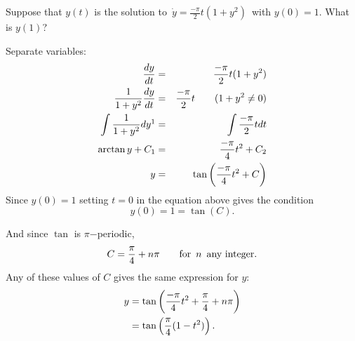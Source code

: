 \begin{homework}
  Suppose that $y(t)$ is the solution to $\, \displaystyle \dot y = \frac{-\pi }{2}t(1+y^2)\,$
  with $y(0) = 1$. What is $y(1)$?
\end{homework}
Separate variables:
\begin{eqnarray*}
  \displaystyle \frac{dy}{dt}
  \displaystyle &=& \displaystyle \frac{-\pi }{2}t(1+y^2) \\
  \displaystyle  \frac{1}{1+y^2} \frac{dy}{dt}
  \displaystyle &=& \frac{-\pi }{2}t \qquad (1+y^2\neq 0) \\
  \displaystyle  \int \frac{1}{1+y^2} dy \footnotemark
  \displaystyle &=& \int \frac{-\pi }{2}t dt  \\
  \displaystyle  \arctan y + C_1 
  \displaystyle &=& \frac{-\pi }{4}t^2 + C_2 \\
  \displaystyle  y 
  \displaystyle &=& \tan \left( \frac{-\pi }{4}t^2 + C \right)
\end{eqnarray*}
Since $y(0) = 1$ setting $t = 0$ in the equation above gives the condition
\begin{equation*}
  y(0) = 1 = \tan (C). 
\end{equation*}

And since $\tan$ is $\pi$−periodic,
\begin{equation*}
  \displaystyle
  \displaystyle C
  \displaystyle =\frac{\pi }{4} +n\pi \qquad \text {for }\, n\,
  \text { any integer}.
\end{equation*}
Any of these values of $C$ gives the same expression for $y$:
\begin{align*}
  \displaystyle  \displaystyle y
  \displaystyle &= \tan \left(\frac{-\pi }{4}t^2 + \frac{\pi }{4} +n\pi \right) \\
  \displaystyle &= \tan \left(\frac{\pi }{4}(1-t^2)\right).
\end{align*}


